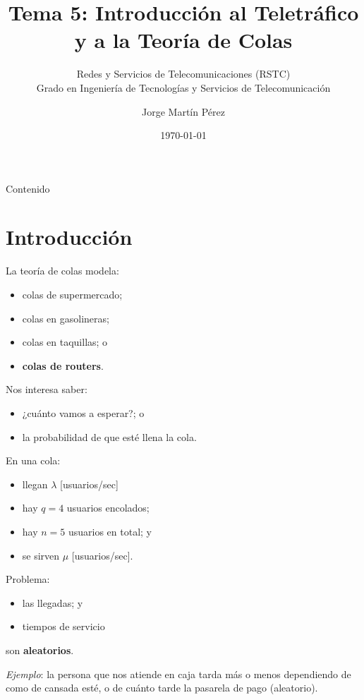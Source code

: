 \documentclass[xcolor={x11names}]{beamer}
\title[Tema 5]{Tema 5: Introducción al Teletráfico\\y a la Teoría de Colas}
\subtitle{Redes y Servicios de Telecomunicaciones (RSTC)\\
Grado en Ingeniería de Tecnologías y Servicios de Telecomunicación}
\author{Jorge Martín Pérez\inst{1}}
\institute{
    \inst{1}
    Departamento de Ingeniería Telemática, Universidad Politécnica de Madrid
}
\date{\today}
\begin{document}
\frame{\titlepage}


\begin{frame}{Contenido}
    \tableofcontents
\end{frame}




\section{Introducción}
\begin{frame}{\secname}
    La teoría de colas modela:
    \begin{itemize}
        \item colas de supermercado;
        \item colas en gasolineras;
        \item colas en taquillas; o
        \item \textbf{colas de routers}.
    \end{itemize}

    \vfill
    Nos interesa saber:
    \begin{itemize}
        \item ¿cuánto vamos a esperar?; o
        \item la probabilidad de que esté llena la cola.
    \end{itemize}
\end{frame}



\begin{frame}{\secname}
    \begin{figure}
        
    \end{figure}

    En una cola:
    \begin{itemize}
        \item llegan $\lambda$ [usuarios/sec]
        \item hay $q=4$ usuarios encolados;
        \item hay $n=5$ usuarios en total; y
        \item se sirven $\mu$ [usuarios/sec].
    \end{itemize}
\end{frame}


\begin{frame}{\secname}
    Problema:
    \begin{itemize}
        \item las llegadas; y
        \item tiempos de servicio
    \end{itemize}
    son \textbf{aleatorios}.

    \vfill

    \textit{Ejemplo}: la persona que nos
    atiende en caja tarda más o menos
    dependiendo de como de cansada esté,
    o de cuánto tarde la pasarela de pago
    (aleatorio).
\end{frame}
\end{document}
